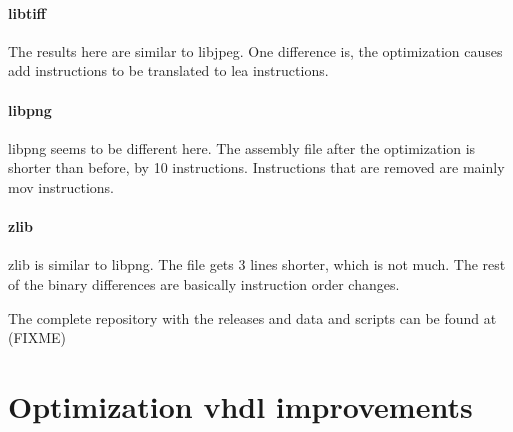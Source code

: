 \paragraph{libtiff} The results here are similar to libjpeg. One difference is, the optimization causes add instructions to be translated to lea instructions. 

\paragraph{libpng} libpng seems to be different here. The assembly file after the optimization is shorter than before, by 10 instructions. Instructions that are removed are mainly mov instructions.

\paragraph{zlib} zlib is similar to libpng. The file gets 3 lines shorter, which is not much. The rest of the binary differences are basically instruction order changes.

The complete repository with the releases and data and scripts can be found at (FIXME)

\section{Optimization vhdl improvements}
%